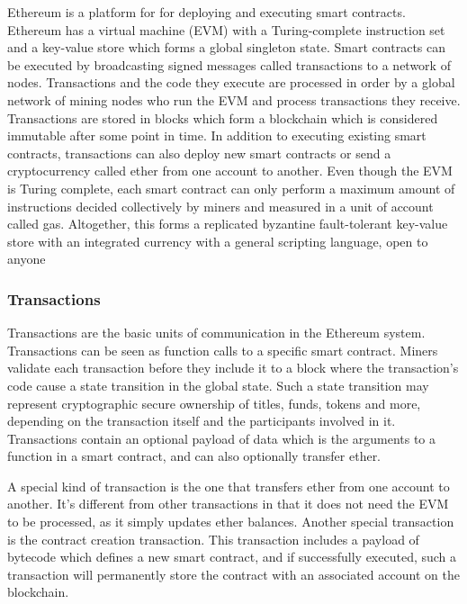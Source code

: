 Ethereum \cite{wood2018ethereum} is a platform for for deploying and executing smart contracts. Ethereum has a virtual machine (EVM) with a Turing-complete instruction set and a key-value store which forms a global singleton state. Smart contracts can be executed by broadcasting signed messages called transactions to a network of nodes. Transactions and the code they execute are processed in order by a global network of mining nodes who run the EVM and process transactions they receive. Transactions are stored in blocks which form a blockchain which is considered immutable after some point in time. In addition to executing existing smart contracts, transactions can also deploy new smart contracts or send a cryptocurrency called ether from one account to another. Even though the EVM is Turing complete, each smart contract can only perform a maximum amount of instructions decided collectively by miners and measured in a unit of account called gas. Altogether, this forms a replicated byzantine fault-tolerant key-value store with an integrated currency with a general scripting language, open to anyone

\subsubsection{Transactions}
Transactions are the basic units of communication in the Ethereum system. Transactions can be seen as function calls to a specific smart contract. Miners validate each transaction before they include it to a block where the transaction's code cause a state transition in the global state. Such a state transition may represent cryptographic secure ownership of titles, funds, tokens and more, depending on the transaction itself and the participants involved in it. Transactions contain an optional payload of data which is the arguments to a function in a smart contract, and can also optionally transfer ether. 

A special kind of transaction is the one that transfers ether from one account to another. It's different from other transactions in that it does not need the EVM to be processed, as it simply updates ether balances. Another special transaction is the contract creation transaction. This transaction includes a payload of bytecode which defines a new smart contract, and if successfully executed, such a transaction will permanently store the contract with an associated account on the blockchain.

